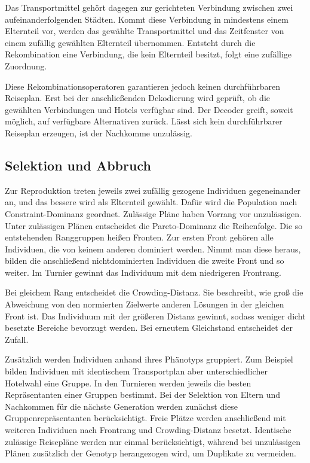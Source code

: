 Das Transportmittel gehört dagegen zur gerichteten Verbindung zwischen zwei aufeinanderfolgenden Städten. Kommt diese Verbindung in mindestens einem Elternteil vor, werden das gewählte Transportmittel und das Zeitfenster von einem zufällig gewählten Elternteil übernommen. Entsteht durch die Rekombination eine Verbindung, die kein Elternteil besitzt, folgt eine zufällige Zuordnung.

Diese Rekombinationsoperatoren garantieren jedoch keinen durchführbaren Reiseplan. Erst bei der anschließenden Dekodierung wird geprüft, ob die gewählten Verbindungen und Hotels verfügbar sind. Der Decoder greift, soweit möglich, auf verfügbare Alternativen zurück. Lässt sich kein durchführbarer Reiseplan erzeugen, ist der Nachkomme unzulässig.

\subsection{Selektion und Abbruch}
\label{subsec:selektion}

Zur Reproduktion treten jeweils zwei zufällig gezogene Individuen gegeneinander an, und das bessere wird als Elternteil gewählt. Dafür wird die Population nach Constraint-Dominanz geordnet. Zulässige Pläne haben Vorrang vor unzulässigen. Unter zulässigen Plänen entscheidet die Pareto-Dominanz die Reihenfolge. Die so entstehenden Ranggruppen heißen Fronten. Zur ersten Front gehören alle Individuen, die von keinem anderen dominiert werden. Nimmt man diese heraus, bilden die anschließend nichtdominierten Individuen die zweite Front und so weiter. Im Turnier gewinnt das Individuum mit dem niedrigeren Frontrang.

Bei gleichem Rang entscheidet die Crowding-Distanz. Sie beschreibt, wie groß die Abweichung von den normierten Zielwerte anderen Lösungen in der gleichen Front ist. Das Individuum mit der größeren Distanz gewinnt, sodass weniger dicht besetzte Bereiche bevorzugt werden. Bei erneutem Gleichstand entscheidet der Zufall.

Zusätzlich werden Individuen anhand ihres Phänotyps gruppiert. Zum Beispiel bilden Individuen mit identischem Transportplan aber unterschiedlicher Hotelwahl eine Gruppe. In den Turnieren werden jeweils die besten Repräsentanten einer Gruppen bestimmt. Bei der Selektion von Eltern und Nachkommen für die nächste Generation werden zunächst diese Gruppenrepräsentanten berücksichtigt. Freie Plätze werden anschließend mit weiteren Individuen nach Frontrang und Crowding-Distanz besetzt. Identische zulässige Reisepläne werden nur einmal berücksichtigt, während bei unzulässigen Plänen zusätzlich der Genotyp herangezogen wird, um Duplikate zu vermeiden.

